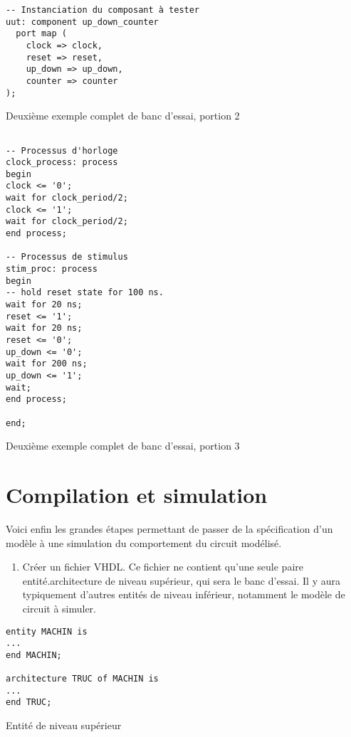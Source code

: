 \documentclass[letter, oneside]{book}
\begin{document}
\begin{enumerate}
\begin{listing}[htbp]
\begin{verbatim}
-- Instanciation du composant à tester
uut: component up_down_counter
  port map (
    clock => clock,
    reset => reset,
    up_down => up_down,
    counter => counter
);

\end{verbatim}
\caption{Deuxième exemple complet de banc d'essai, portion 2}
\end{listing}

\begin{listing}[htbp]
\begin{verbatim}

-- Processus d'horloge
clock_process: process
begin
clock <= '0';
wait for clock_period/2;
clock <= '1';
wait for clock_period/2;
end process;

-- Processus de stimulus
stim_proc: process
begin
-- hold reset state for 100 ns.
wait for 20 ns;
reset <= '1';
wait for 20 ns;
reset <= '0';
up_down <= '0';
wait for 200 ns;
up_down <= '1';
wait;
end process;

end;
\end{verbatim}
\caption{Deuxième exemple complet de banc d'essai, portion 3}
\end{listing}
\end{enumerate}


\section{Compilation et simulation}
\label{sec:org3047441}

Voici enfin les grandes étapes permettant de passer de la spécification d'un
modèle à une simulation du comportement du circuit modélisé. 

\begin{enumerate}
\item Créer un fichier VHDL. Ce fichier ne contient qu'une seule paire
entité.architecture de niveau supérieur, qui sera le banc
d'essai. Il y aura typiquement d'autres entités de niveau
inférieur, notamment le modèle de circuit à simuler.
\end{enumerate}

\begin{listing}[htbp]
\begin{verbatim}
entity MACHIN is
...
end MACHIN;

architecture TRUC of MACHIN is
...
end TRUC;
\end{verbatim}
\caption{Entité de niveau supérieur}
\end{listing}
\end{document}
